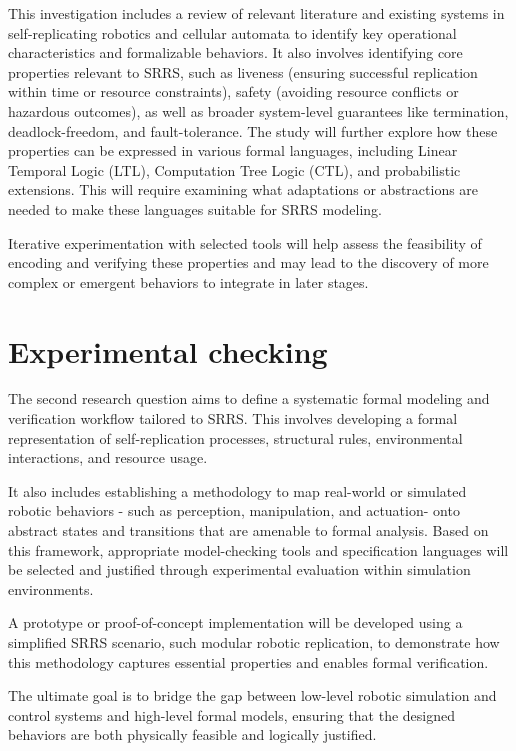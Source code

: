 This investigation includes a review of relevant literature and existing systems 
in self-replicating robotics and cellular automata to identify key operational 
characteristics and formalizable behaviors. It also involves identifying 
core properties relevant to SRRS, such as liveness (ensuring successful 
replication within time or resource constraints), safety (avoiding 
resource conflicts or hazardous outcomes), as well as broader system-level guarantees 
like termination, deadlock-freedom, and fault-tolerance. 
The study will further explore how these properties can be 
expressed in various formal languages, including Linear 
Temporal Logic (LTL), Computation Tree Logic (CTL), and probabilistic extensions. 
This will require examining what adaptations or abstractions are needed to 
make these languages suitable for SRRS modeling. 

Iterative experimentation with selected tools will help assess the feasibility 
of encoding and verifying these properties and may lead to the discovery 
of more complex or emergent behaviors to integrate in later stages.

\section{Experimental checking}



The second research question aims to define a systematic formal modeling 
and verification workflow tailored to SRRS. 
This involves developing a formal representation of 
self-replication processes, structural rules, environmental interactions, 
and resource usage. 

It also includes establishing a methodology to map real-world 
or simulated robotic behaviors - such as perception, manipulation, and actuation- onto 
abstract states and transitions that are amenable to formal analysis. 
Based on this framework, appropriate model-checking tools and specification 
languages will be selected and justified through experimental evaluation within 
simulation environments. 

A prototype or proof-of-concept implementation will be developed 
using a simplified SRRS scenario, such modular robotic replication, 
to demonstrate how this methodology captures essential properties and enables formal verification. 

The ultimate goal is to bridge the gap between low-level robotic simulation and control 
systems and high-level formal models, ensuring that the designed 
behaviors are both physically feasible and logically justified.


